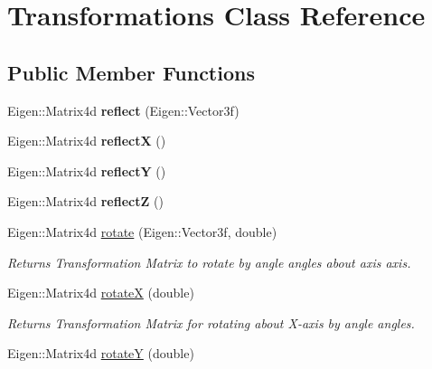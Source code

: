 \hypertarget{classTransformations}{}\section{Transformations Class Reference}
\label{classTransformations}
\subsection*{Public Member Functions}
\begin{DoxyCompactItemize}
\item 
\mbox{\label{classTransformations_ab1f9dc8128e3ecf9105fb538f9725ea8}} 
Eigen\+::\+Matrix4d {\bfseries reflect} (Eigen\+::\+Vector3f)
\item 
\mbox{\label{classTransformations_a986ab195864427749bcba507a2d5fe58}} 
Eigen\+::\+Matrix4d {\bfseries reflectX} ()
\item 
\mbox{\label{classTransformations_a3ff59b80990ec879ed6d534dc620cee3}} 
Eigen\+::\+Matrix4d {\bfseries reflectY} ()
\item 
\mbox{\label{classTransformations_afa74f1e98c9b69e368442c011d8cd046}} 
Eigen\+::\+Matrix4d {\bfseries reflectZ} ()
\item 
Eigen\+::\+Matrix4d \hyperlink{classTransformations_a9d470736a0a55415259c9eea0bf8a2e0}{rotate} (Eigen\+::\+Vector3f, double)
\begin{DoxyCompactList}\small\item\em Returns Transformation Matrix to rotate by \textquotesingle{}angle\textquotesingle{} angles about \textquotesingle{}axis\textquotesingle{} axis. \end{DoxyCompactList}\item 
Eigen\+::\+Matrix4d \hyperlink{classTransformations_a4c54165181c5d5ec5bb7db9e3176c4a7}{rotateX} (double)
\begin{DoxyCompactList}\small\item\em Returns Transformation Matrix for rotating about X-\/axis by \textquotesingle{}angle\textquotesingle{} angles. \end{DoxyCompactList}\item 
Eigen\+::\+Matrix4d \hyperlink{classTransformations_aa4a1b79a607ba97fa839c7f247ebc4df}{rotateY} (double)

\end{DoxyCompactItemize}
